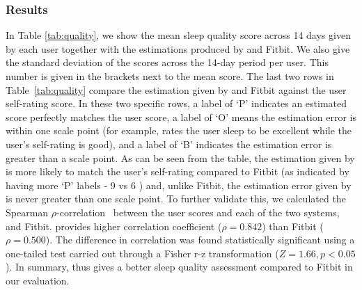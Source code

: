 \subsubsection{Results}
In Table \ref{tab:quality}, we show the mean sleep quality score across 14 days given by each user together with the estimations produced by {\systemname} and Fitbit. We also give the standard deviation of the scores across the 14-day period per user. This number is given in the brackets next to the mean score. The last two rows in Table~\ref{tab:quality} compare the estimation given by {\systemname} and Fitbit against the user self-rating score. In these two specific rows, a label of `P' indicates an estimated score perfectly matches the user score, a label of `O' means the estimation error is within one scale point (for example, {\systemname} rates the user sleep to be excellent while the user's self-rating is good), and a label of `B' indicates the estimation error is greater than a scale point. As can be seen from the table, the estimation given by {\systemname} is more likely to match the user's self-rating compared to Fitbit (as indicated by having more `P' labels - 9 vs 6 ) and, unlike Fitbit, the estimation error given by {\systemname} is never greater than one scale point. To further validate this, we calculated the Spearman $\rho$-correlation~\cite{richardson2015nonparametric} between the user scores and each of the two systems, {\systemname} and Fitbit. {\systemname} provides higher correlation coefficient ($\rho = 0.842$) than Fitbit ($\rho = 0.500$). The difference in correlation was found statistically significant using a one-tailed test carried out through a Fisher r-z transformation ($Z = 1.66, p < 0.05$).  In summary, {\systemname} thus gives a better sleep quality assessment compared to Fitbit in our evaluation.


